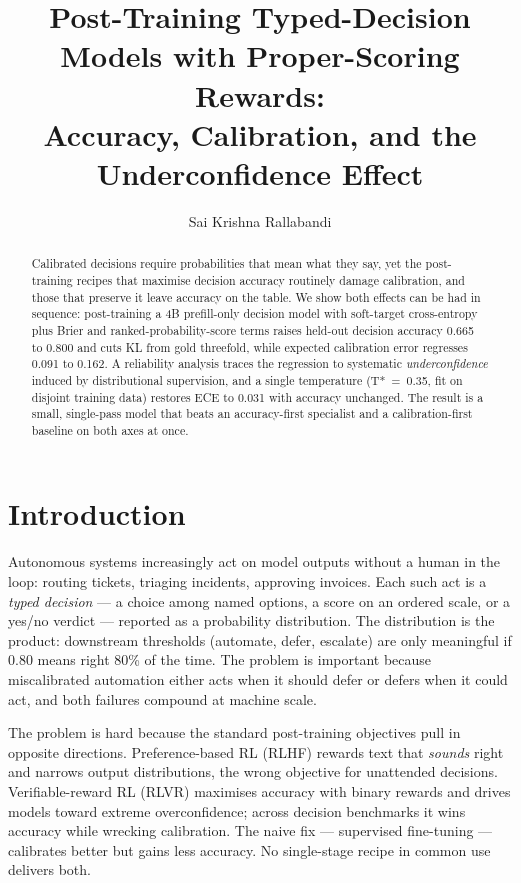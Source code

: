 \documentclass{article}
\title{Post-Training Typed-Decision Models with Proper-Scoring Rewards:\\Accuracy, Calibration, and the Underconfidence Effect}
\author{Sai Krishna Rallabandi}
\begin{document}
\maketitle

\begin{abstract}
Calibrated decisions require probabilities that mean what they say, yet the
post-training recipes that maximise decision accuracy routinely damage
calibration, and those that preserve it leave accuracy on the table. We show
both effects can be had in sequence: post-training a 4B prefill-only
decision model with soft-target cross-entropy plus Brier and
ranked-probability-score terms raises held-out decision accuracy 0.665 to
0.800 and cuts KL from gold threefold, while expected calibration error
regresses 0.091 to 0.162. A reliability analysis traces the regression to
systematic \emph{underconfidence} induced by distributional supervision, and
a single temperature (T*~=~0.35, fit on disjoint training data) restores ECE
to 0.031 with accuracy unchanged. The result is a small, single-pass model
that beats an accuracy-first specialist and a calibration-first baseline on
both axes at once.
\end{abstract}

\section{Introduction}

Autonomous systems increasingly act on model outputs without a human in the
loop: routing tickets, triaging incidents, approving invoices. Each such act
is a \emph{typed decision} — a choice among named options, a score on an
ordered scale, or a yes/no verdict — reported as a probability distribution.
The distribution is the product: downstream thresholds (automate, defer,
escalate) are only meaningful if 0.80 means right 80\% of the time. The
problem is important because miscalibrated automation either acts when it
should defer or defers when it could act, and both failures compound at
machine scale.

The problem is hard because the standard post-training objectives pull in
opposite directions. Preference-based RL (RLHF) rewards text that
\emph{sounds} right and narrows output distributions, the wrong objective
for unattended decisions. Verifiable-reward RL (RLVR) maximises accuracy
with binary rewards and drives models toward extreme overconfidence; across
decision benchmarks it wins accuracy while wrecking calibration. The naive
fix — supervised fine-tuning — calibrates better but gains less accuracy.
No single-stage recipe in common use delivers both.
\end{document}
